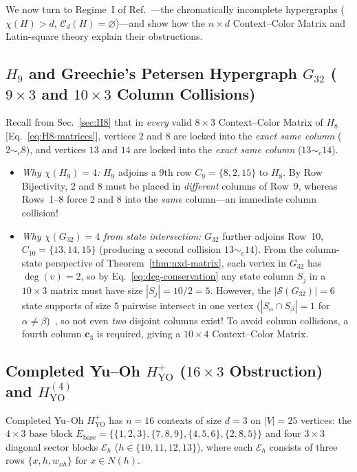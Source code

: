 \documentclass[aps,pra,reprint,superscriptaddress,longbibliography,nofootinbib,floatfix,10pt]{revtex4-2}
\theoremstyle{definition}\newtheorem{definition}[theorem]{Definition}
\theoremstyle{remark}\newtheorem{remark}[theorem]{Remark}
\newcommand{\Sc}{\mathcal S}\newcommand{\Cc}{\mathcal C}
\newcommand{\YO}{\mathrm{YO}}\newcommand{\ip}[2]{\langle #1,#2\rangle}
\begin{document}
We now turn to Regime~I of Ref.~\cite{svozil-2025-color}—the chromatically incomplete hypergraphs ($\chi(H)>d$, $\Cc_d(H)=\varnothing$)—and show how the $n\times d$ Context--Color Matrix and Latin-square theory explain their obstructions.

\subsection{\texorpdfstring{$H_9$}{H9} and Greechie's Petersen Hypergraph \texorpdfstring{$G_{32}$}{G32} (\texorpdfstring{$9\times 3$ and $10\times 3$}{9x3 and 10x3} Column Collisions)}\label{sec:G32}

Recall from Sec.~\ref{sec:H8} that in \emph{every} valid $8\times 3$ Context--Color Matrix of $H_8$ [Eq.~\eqref{eq:H8-matrices}], vertices $2$ and $8$ are locked into the \emph{exact same column} ($2\sim_c 8$), and vertices $13$ and $14$ are locked into the \emph{exact same column} ($13\sim_c 14$).
\begin{itemize}
\item \emph{Why $\chi(H_9)=4$:} $H_9$ adjoins a $9$th row $C_9=\{8,2,15\}$ to $H_8$. By Row Bijectivity, $2$ and $8$ must be placed in \emph{different} columns of Row~9, whereas Rows~1--8 force $2$ and $8$ into the \emph{same} column—an immediate column collision!
\item \emph{Why $\chi(G_{32})=4$ from state intersection:} $G_{32}$ further adjoins Row~10, $C_{10}=\{13,14,15\}$ (producing a second collision $13\sim_c 14$). From the column-state perspective of Theorem~\ref{thm:nxd-matrix}, each vertex in $G_{32}$ has $\deg(v)=2$, so by Eq.~\eqref{eq:deg-conservation} any state column $S_j$ in a $10\times 3$ matrix must have size $|S_j|=10/2=5$. However, the $|\Sc(G_{32})|=6$ state supports of size $5$ pairwise intersect in one vertex ($|S_\alpha\cap S_\beta|=1$ for $\alpha\neq\beta$)~\cite{svozil-2025-color}, so not even \emph{two} disjoint columns exist! To avoid column collisions, a fourth column $\mathbf{c}_3$ is required, giving a $10\times 4$ Context--Color Matrix.
\end{itemize}

\subsection{Completed Yu--Oh \texorpdfstring{$H_{\YO}^+$}{HYO+} (\texorpdfstring{$16\times 3$}{16x3} Obstruction) and \texorpdfstring{$H_{\YO}^{(4)}$}{HYO(4)}}\label{sec:HYO}

Completed Yu--Oh $H_{\YO}^+$ has $n=16$ contexts of size $d=3$ on $|V|=25$ vertices: the $4\times 3$ base block $E_{\mathrm{base}}=\{\{1,2,3\},\{7,8,9\},\{4,5,6\},\{2,8,5\}\}$ and four $3\times 3$ diagonal sector blocks $\mathcal{E}_{h}$ ($h\in\{10,11,12,13\}$), where each $\mathcal{E}_h$ consists of three rows $\{x,h,w_{xh}\}$ for $x\in N(h)$.
\end{document}
